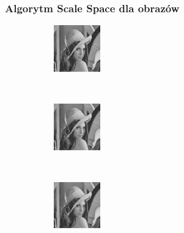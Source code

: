 \begin{frame}
\frametitle{Algorytm Scale Space dla obrazów}


\begin{figure}[h]
\begin{center}
\begin{subfigure}[b]{2cm}
                 \centering
                 \includegraphics[width=2cm]{Lena_scales1.jpg}
         \end{subfigure}%
		 ~
\begin{subfigure}[b]{2cm}
                 \centering
                 \includegraphics[width=2cm]{Lena_scales2.jpg}
         \end{subfigure}%
		 ~
\begin{subfigure}[b]{2cm}
                 \centering
                 \includegraphics[width=2cm]{Lena_scales3.jpg}
         \end{subfigure}%
		 

\end{center}
\end{figure}
\end{frame}
